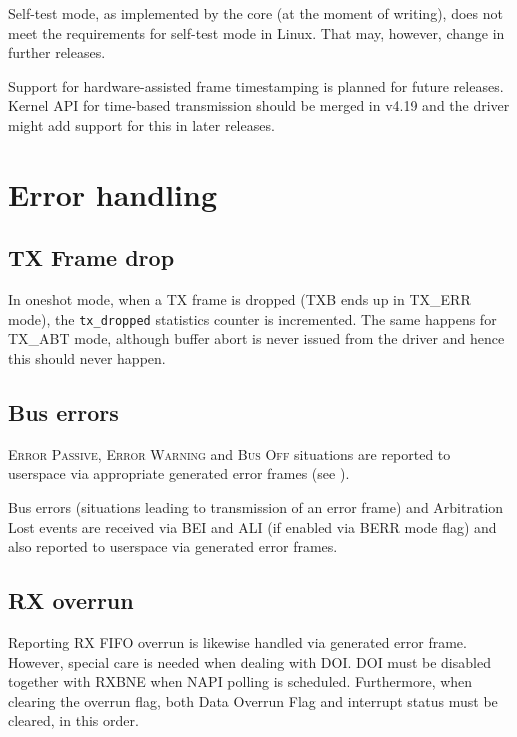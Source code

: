 Self-test mode, as implemented by the core (at the moment of writing), does not
meet the requirements for self-test mode in Linux. That may, however, change in
further releases.

Support for hardware-assisted frame timestamping is planned for future releases.
Kernel API for time-based transmission should be merged in v4.19 and the driver
might add support for this in later releases.

\section{Error handling}

\subsection{TX Frame drop}

In oneshot mode, when a TX frame is dropped (TXB ends up in TX\_ERR mode), the
\verb|tx_dropped| statistics counter is incremented. The same happens for
TX\_ABT mode, although buffer abort is never issued from the driver and hence
this should never happen.

\subsection{Bus errors}

\textsc{Error Passive}, \textsc{Error Warning} and \textsc{Bus Off} situations
are reported to userspace via appropriate generated error frames (see
\cite{linux:socketcan}).

Bus errors (situations leading to transmission of an error frame) and
Arbitration Lost events are received via BEI and ALI (if enabled via BERR mode
flag) and also reported to userspace via generated error frames.

\subsection{RX overrun}

Reporting RX FIFO overrun is likewise handled via generated error frame. However,
special care is needed when dealing with DOI. DOI must be disabled together
with RXBNE when NAPI polling is scheduled. Furthermore, when clearing the overrun flag,
both Data Overrun Flag and interrupt status must be cleared, in this order.



